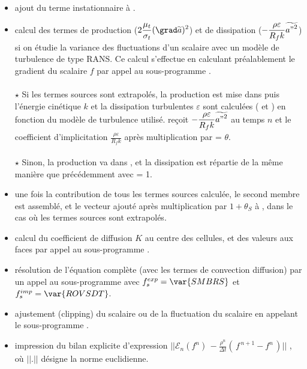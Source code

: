 \begin{itemize}
\item ajout du terme instationnaire à .

\item calcul des termes de production ($2
\displaystyle\frac{\mu_t}{\sigma_t}(\grad \widetilde{a})^2$) et de dissipation
($\displaystyle - \frac{\rho
\varepsilon}{R_f k}\widetilde{{a"}^2}$) si on étudie la variance des
fluctuations d'un scalaire avec un modèle de turbulence de type
RANS. Ce calcul s'effectue en calculant préalablement
le gradient du scalaire $f$ par appel au sous-programme .
\\\\
$\star$ Si les termes sources sont extrapolés, la production est mise dans
 puis l'énergie cinétique $k$ et la dissipation turbulentes
$\varepsilon$ sont calculées ( et ) en
fonction du modèle de turbulence utilisé.  reçoit
$\displaystyle - \frac{\rho \varepsilon}{R_f k}\widetilde{{a"}^2}$ au temps $n$
et  le coefficient d'implicitation
$\displaystyle \frac{\rho \varepsilon}{R_f k}$ après multiplication par
 = $\theta$.
\\\\
$\star$ Sinon, la production va dans , et la dissipation est répartie
de la même manière que précédemment avec  = 1.
\\
\item une fois la contribution de tous les termes sources calculée, le second
membre est assemblé, et le vecteur  ajouté après multiplication par
$1+\theta_S$ à , dans le cas où les termes sources sont extrapolés.

\item calcul du coefficient de diffusion $K$ au centre des cellules, et des
valeurs aux faces par appel au sous-programme .

\item résolution de l'équation complète (avec les termes de convection
diffusion) par un appel au sous-programme  avec
$f_s^{exp}=\var{SMBRS}$ et $f_s^{imp}=\var{ROVSDT}$.

\item ajustement (clipping) du scalaire ou de la fluctuation du scalaire en
appelant le sous-programme .

\item impression du bilan explicite d'expression
$||\mathcal{E}_{n}(f^n)\,- \displaystyle \frac {\rho^n}{\Delta t} (\,f^{\,n+1} -
f^n\,)|| $ , où $|| . ||$ désigne la norme euclidienne.
\\\\
\end{itemize}

